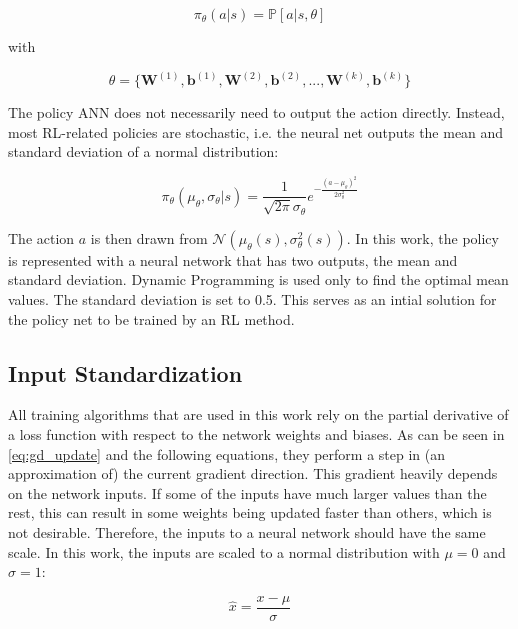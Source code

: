 \begin{equation}
\pi_\theta(a|s)=\mathbb{P}[a|s,\theta]
\end{equation}

with

\begin{equation}
\theta = \{\boldsymbol{W}^{(1)},\boldsymbol{b}^{(1)},\boldsymbol{W}^{(2)},\boldsymbol{b}^{(2)}, ...,
\boldsymbol{W}^{(k)},\boldsymbol{b}^{(k)}\}
\label{eq:theta}
\end{equation}

The policy ANN does not necessarily need to output the action directly. Instead, most RL-related policies are stochastic, i.e. the neural net outputs the mean and standard deviation of a normal distribution:

\begin{equation}
\pi_\theta(\mu_\theta,\sigma_\theta|s)=\frac{1}{\sqrt{2\pi}\sigma_\theta}e^{-\frac{(a-\mu_\theta)^2}{2\sigma_\theta^2}}
\end{equation}

The action $a$ is then drawn from $\mathcal{N}(\mu_\theta(s),\sigma^2_\theta(s))$. 
In this work, the policy is represented with a neural network that has two outputs, the mean and standard deviation. Dynamic Programming is used only to find the optimal mean values. The standard deviation is set to 0.5. This serves as an intial solution for the policy net to be trained by an RL method.

\subsection*{Input Standardization}

All training algorithms that are used in this work rely on the partial derivative of a loss function with respect to the network weights and biases. As can be seen in \ref{eq:gd_update} and the following equations, they perform a step in (an approximation of) the current gradient direction. This gradient heavily depends on the network inputs. If some of the inputs have much larger values than the rest, this can result in some weights being updated faster than others, which is not desirable. Therefore, the inputs to a neural network should have the same scale. In this work, the inputs are scaled to a normal distribution with $\mu = 0$ and $\sigma = 1$:

\begin{equation}
\hat{x} = \frac{x - \mu}{\sigma}
\end{equation}

